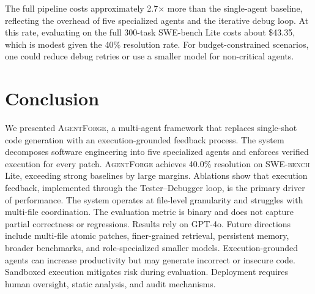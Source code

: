 \documentclass[journal]{IEEEtran}
\newcommand{\agentforge}{\textsc{AgentForge}}
\newcommand{\swebench}{\textsc{SWE-bench}}
\begin{document}
The full pipeline costs approximately 2.7$\times$ more than the single-agent baseline, reflecting the overhead of five specialized agents and the iterative debug loop. At this rate, evaluating on the full 300-task SWE-bench Lite costs about \$43.35, which is modest given the 40\% resolution rate. For budget-constrained scenarios, one could reduce debug retries or use a smaller model for non-critical agents.


\section{Conclusion}
\label{sec:conclusion}
We presented \agentforge{}, a multi-agent framework that replaces single-shot code generation with an execution-grounded feedback process. The system decomposes software engineering into five specialized agents and enforces verified execution for every patch. \agentforge{} achieves 40.0\% resolution on \swebench{} Lite, exceeding strong baselines by large margins. Ablations show that execution feedback, implemented through the Tester--Debugger loop, is the primary driver of performance. The system operates at file-level granularity and struggles with multi-file coordination. The evaluation metric is binary and does not capture partial correctness or regressions. Results rely on GPT-4o. Future directions include multi-file atomic patches, finer-grained retrieval, persistent memory, broader benchmarks, and role-specialized smaller models. Execution-grounded agents can increase productivity but may generate incorrect or insecure code. Sandboxed execution mitigates risk during evaluation. Deployment requires human oversight, static analysis, and audit mechanisms.






\end{document}

